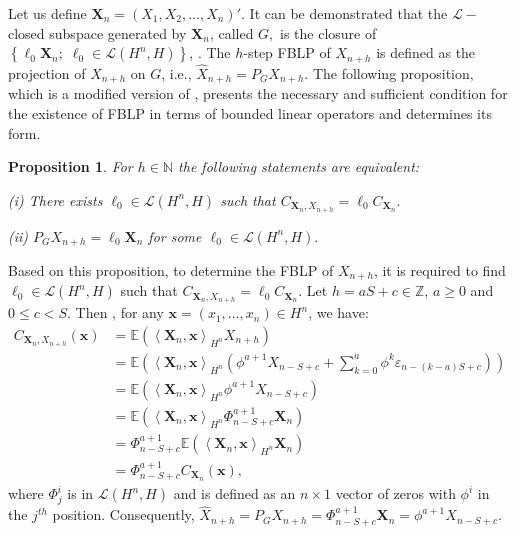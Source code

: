 \documentclass[11pt,a4paper]{article}
\newtheorem{Proposition} {Proposition}[section]
\numberwithin{equation}{section}
\newcommand{\E}{\mathbb{E}}
\begin{document}
Let us define $\bm{X}_n=\left(X_1,X_2,\dots,X_n\right)'$. It can be demonstrated that the $\mathcal{L}-$closed  subspace generated by $\bm{X}_n$, called $G,$ is the closure of $\left\{\ell_0\bm{X}_n;\;\ell_0\in \mathcal{L}\left(H^n,H\right)\right\}$, \citep[see][Theorem 1.8 for the proof]{Bosq2000}. The $h$-step FBLP of $X_{n+h}$ is defined as the projection of $X_{n+h}$ on $G$, i.e., $\hat{X}_{n+h}=P_G X_{n+h}$. The following proposition, which is a modified version of \citep[see][Proposition 2.2]{Bosq2014}, presents the necessary and sufficient condition for the existence of FBLP in terms of bounded linear operators and determines its form.

\begin{Proposition}\label{prop.bosq.2014}
  For $h \in {\mathbb{N}}$ the following statements are equivalent:
  \begin{compactitem}[(i)]
    \item[(i)] There exists $\ell_0\in\mathcal{L}\left(H^n,H\right)$ such that $C_{\bm{X}_n ,X_{ n + h}} = \ell_0 C_{\bm{X}_n}.$
    \item[(ii)] $P_G X_{n + h} = \ell_0\bm{X}_n$ for some $\ell_0\in \mathcal{L}\left(H^n,H\right).$
  \end{compactitem}
\end{Proposition}

Based on this proposition, to determine the FBLP of $X_{n+h}$, it is required to find $\ell_0\in\mathcal{L}\left(H^n,H\right)$  such that $C_{\bm{X}_n ,X_{ n + h}} = \ell_0 C_{\bm{X}_n}$. Let $h=aS+c\in {\mathbb{Z}}$, $a\geq 0$ and $0\leq c<S$. Then , for any $\bm{x}=\left(x_1,\dots,x_n\right)\in H^n$, we have:
\begin{align*}
    C_{\bm{X}_n ,X_{ n + h}}\left(\bm{x}\right)
     & = \E\left(\left\langle \bm{X}_n,\bm{x}\right\rangle_{H^n} X_{n+h}\right) \\
     & = \E\left(\left\langle \bm{X}_n,\bm{x}\right\rangle_{H^n} \left( \phi^{a+1} X_{n-S+c}+\sum_{k=0}^a\phi^k\varepsilon_{n-\left(k-a\right)S+c}\right)      \right) \\
     & = \E\left(\left\langle \bm{X}_n,\bm{x}\right\rangle_{H^n} \phi^{a+1} X_{n-S+c}\right) \\
     & = \E\left(\left\langle \bm{X}_n,\bm{x}\right\rangle_{H^n} \Phi^{a+1}_{n-S+c}\bm{X}_{n}\right) \\
     & = \Phi^{a+1}_{n-S+c}\E\left(\left\langle \bm{X}_n,\bm{x}\right\rangle_{H^n} \bm{X}_{n}\right) \\
     & = \Phi^{a+1}_{n-S+c}C_{\bm{X}_n}\left(\bm{x}\right),
\end{align*}
where $\Phi^{i}_{j}$ is in $\mathcal{L}\left(H^n,H\right)$ and is defined as an $n\times 1$ vector of zeros with  $\phi^{i}$ in the $j^{th}$ position. Consequently, $\hat{X}_{n+h}=P_G X_{n+h}=\Phi^{a+1}_{n-S+c}{\bm{X}_n }=\phi^{a+1}X_{n-S+c}.$
\end{document}
